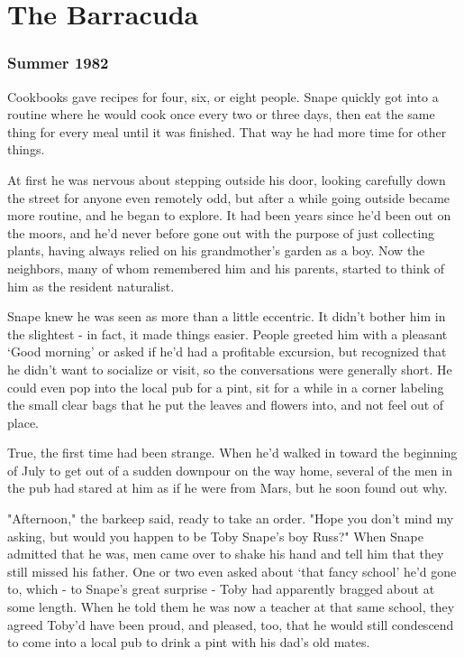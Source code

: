 
\chapter{The Barracuda}

\subsection{Summer 1982}

Cookbooks gave recipes for four, six, or eight people. Snape quickly got into a routine where he would cook once every two or three days, then eat the same thing for every meal until it was finished. That way he had more time for other things.

At first he was nervous about stepping outside his door, looking carefully down the street for anyone even remotely odd, but after a while going outside became more routine, and he began to explore. It had been years since he'd been out on the moors, and he'd never before gone out with the purpose of just collecting plants, having always relied on his grandmother's garden as a boy. Now the neighbors, many of whom remembered him and his parents, started to think of him as the resident naturalist.

Snape knew he was seen as more than a little eccentric. It didn't bother him in the slightest - in fact, it made things easier. People greeted him with a pleasant `Good morning' or asked if he'd had a profitable excursion, but recognized that he didn't want to socialize or visit, so the conversations were generally short. He could even pop into the local pub for a pint, sit for a while in a corner labeling the small clear bags that he put the leaves and flowers into, and not feel out of place.

True, the first time had been strange. When he'd walked in toward the beginning of July to get out of a sudden downpour on the way home, several of the men in the pub had stared at him as if he were from Mars, but he soon found out why.

"Afternoon," the barkeep said, ready to take an order. "Hope you don't mind my asking, but would you happen to be Toby Snape's boy Russ?" When Snape admitted that he was, men came over to shake his hand and tell him that they still missed his father. One or two even asked about `that fancy school' he'd gone to, which - to Snape's great surprise - Toby had apparently bragged about at some length. When he told them he was now a teacher at that same school, they agreed Toby'd have been proud, and pleased, too, that he would still condescend to come into a local pub to drink a pint with his dad's old mates.

